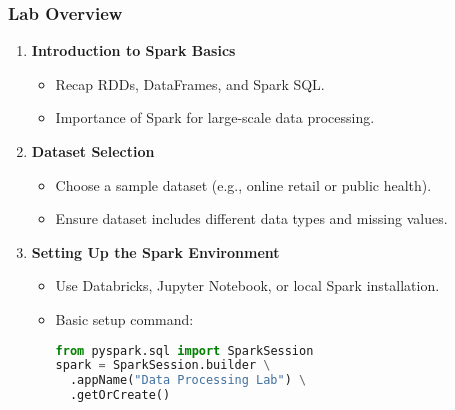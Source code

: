 \documentclass{beamer}
\begin{document}
\begin{frame}[fragile]
    \frametitle{Lab Overview}
    
    \begin{enumerate}
        \item \textbf{Introduction to Spark Basics}
        \begin{itemize}
            \item Recap RDDs, DataFrames, and Spark SQL.
            \item Importance of Spark for large-scale data processing.
        \end{itemize}
        
        \item \textbf{Dataset Selection}
        \begin{itemize}
            \item Choose a sample dataset (e.g., online retail or public health).
            \item Ensure dataset includes different data types and missing values.
        \end{itemize}
        
        \item \textbf{Setting Up the Spark Environment}
        \begin{itemize}
            \item Use Databricks, Jupyter Notebook, or local Spark installation.
            \item Basic setup command:
            \begin{lstlisting}[language=python]
from pyspark.sql import SparkSession
spark = SparkSession.builder \
  .appName("Data Processing Lab") \
  .getOrCreate()
            \end{lstlisting}
        \end{itemize}
    \end{enumerate}
\end{frame}
\end{document}
